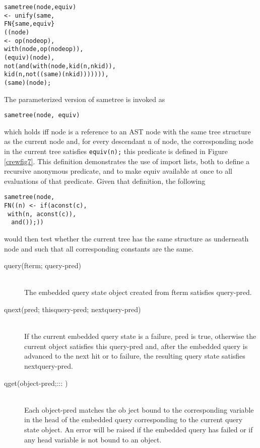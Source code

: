 \label{crewfig7}
\begin{verbatim}
sametree(node,equiv)
<- unify(same,
FN{same,equiv}
((node)
<- op(nodeop),
with(node,op(nodeop)),
(equiv)(node),
not(and(with(node,kid(n,nkid)),
kid(n,not((same)(nkid))))))),
(same)(node);
\end{verbatim}

The parameterized version of sametree is invoked as
\begin{verbatim}
sametree(node, equiv)
\end{verbatim}
which holds iff node is a reference to an AST node with
the same tree structure as the current node and, for
every descendant n of node, the corresponding node in
the current tree satisfies \verb|equiv(n);| this predicate is defined in Figure
\ref{crewfig7}. This definition demonstrates the use
of import lists, both to define a recursive anonymous
predicate, and to make equiv available at once to all
evaluations of that predicate. Given that definition,
the following
\begin{verbatim}
sametree(node,
FN((n) <- if(aconst(c),
 with(n, aconst(c)),
  and());))
\end{verbatim}
would then test whether the current tree has the same
structure as underneath node and such that all corresponding
constants are the same.

\label{crewfig8}

\begin{description}
\item[query(fterm; query-pred)]\ \\
The embedded query state object created from fterm satisfies query-pred.
\item[qnext(pred; thisquery-pred; nextquery-pred)]\ \\
If the current embedded query state is a failure, pred is true, otherwise the
current object satisfies this query-pred and, after the embedded query is
advanced to the next hit or to failure, the resulting query state satisfies
nextquery-pred.
\item[qget(object-pred;::: )]\ \\
Each object-pred matches the ob ject bound to the corresponding variable in the
head of the embedded query corresponding to the current query state object.
An error will be raised if the embedded query has failed or if any head variable
is not bound to an object.
\end{description}

